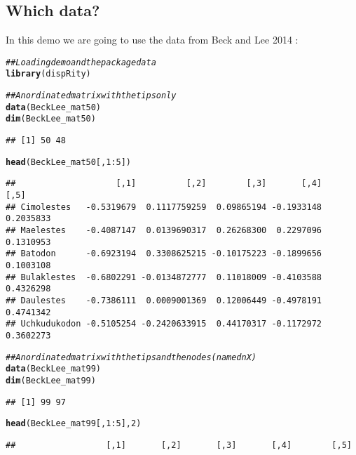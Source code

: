 \documentclass{article}\usepackage[]{graphicx}\usepackage[]{color}
\makeatletter
\newcommand{\hlnum}[1]{\textcolor[rgb]{0.686,0.059,0.569}{#1}}%
\newcommand{\hlcom}[1]{\textcolor[rgb]{0.678,0.584,0.686}{\textit{#1}}}%
\newcommand{\hlopt}[1]{\textcolor[rgb]{0,0,0}{#1}}%
\newcommand{\hlstd}[1]{\textcolor[rgb]{0.345,0.345,0.345}{#1}}%
\newcommand{\hlkwd}[1]{\textcolor[rgb]{0.737,0.353,0.396}{\textbf{#1}}}%
\newenvironment{kframe}{%
 \def\at@end@of@kframe{}%
 \ifinner\ifhmode%
  \def\at@end@of@kframe{\end{minipage}}%
  \begin{minipage}{\columnwidth}%
 \fi\fi%
 \def\FrameCommand##1{\hskip\@totalleftmargin \hskip-\fboxsep
 \colorbox{shadecolor}{##1}\hskip-\fboxsep
     \hskip-\linewidth \hskip-\@totalleftmargin \hskip\columnwidth}%
 \MakeFramed {\advance\hsize-\width
   \@totalleftmargin\z@ \linewidth\hsize
   \@setminipage}}%
 {\par\unskip\endMakeFramed%
 \at@end@of@kframe}
\newenvironment{knitrout}{}{} %
\makeatother
\begin{document}
\subsection{Which data?}
In this demo we are going to use the data from Beck and Lee 2014 \cite{beckancient2014}:

\begin{knitrout}
\color{fgcolor}\begin{kframe}
\begin{alltt}
\hlcom{## Loading demo and the package data}
\hlkwd{library}\hlstd{(dispRity)}
\end{alltt}


{\ttfamily\noindent\itshape\color{messagecolor}{\#\# Loading required package: paleotree}}\begin{alltt}
\hlcom{## An ordinated matrix with the tips only}
\hlkwd{data}\hlstd{(BeckLee_mat50)}
\hlkwd{dim}\hlstd{(BeckLee_mat50)}
\end{alltt}
\begin{verbatim}
## [1] 50 48
\end{verbatim}
\begin{alltt}
\hlkwd{head}\hlstd{(BeckLee_mat50[,}\hlnum{1}\hlopt{:}\hlnum{5}\hlstd{])}
\end{alltt}
\begin{verbatim}
##                    [,1]          [,2]        [,3]       [,4]      [,5]
## Cimolestes   -0.5319679  0.1117759259  0.09865194 -0.1933148 0.2035833
## Maelestes    -0.4087147  0.0139690317  0.26268300  0.2297096 0.1310953
## Batodon      -0.6923194  0.3308625215 -0.10175223 -0.1899656 0.1003108
## Bulaklestes  -0.6802291 -0.0134872777  0.11018009 -0.4103588 0.4326298
## Daulestes    -0.7386111  0.0009001369  0.12006449 -0.4978191 0.4741342
## Uchkudukodon -0.5105254 -0.2420633915  0.44170317 -0.1172972 0.3602273
\end{verbatim}
\begin{alltt}
\hlcom{## An ordinated matrix with the tips and the nodes (named nX)}
\hlkwd{data}\hlstd{(BeckLee_mat99)}
\hlkwd{dim}\hlstd{(BeckLee_mat99)}
\end{alltt}
\begin{verbatim}
## [1] 99 97
\end{verbatim}
\begin{alltt}
\hlkwd{head}\hlstd{(BeckLee_mat99[,}\hlnum{1}\hlopt{:}\hlnum{5}\hlstd{],} \hlnum{2}\hlstd{)}
\end{alltt}
\begin{verbatim}
##                  [,1]       [,2]       [,3]       [,4]        [,5]

\end{verbatim}
\end{kframe}
\end{knitrout}
\end{document}
